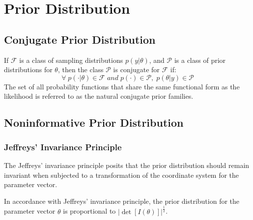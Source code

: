 \section{Prior Distribution}

\subsection{Conjugate Prior Distribution}
\begin{definition}
	If $\mathcal{F}$ is a class of sampling distributions $p(y|\theta)$, and  $\mathcal{P}$ is a class of prior distributions for $\theta$, then the class $\mathcal{P}$ is conjugate for $\mathcal{F}$ if:
	\begin{equation*}
		\forall\;p(\cdot|\theta)\in\mathcal{F}\;and\;p(\cdot)\in\mathcal{P},\;p(\theta|y)\in\mathcal{P}
	\end{equation*}
	The set of all probability functions that share the same functional form as the likelihood is referred to as the natural conjugate prior families.
\end{definition}

\subsection{Noninformative Prior Distribution}
\subsubsection{Jeffreys' Invariance Principle}
The Jeffreys' invariance principle posits that the prior distribution should remain invariant when subjected to a transformation of the coordinate system for the parameter vector.
\begin{definition}
	In accordance with Jeffreys' invariance principle, the prior distribution for the parameter vector $\theta$ is proportional to $|\det[I(\theta)]|^{\frac{1}{2}}$.
\end{definition}
